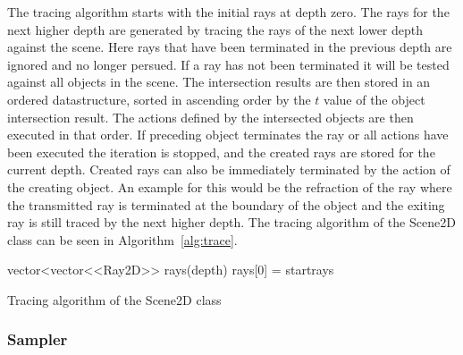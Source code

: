 \documentclass[a4paper,10pt]{article}
\newcommand{\algref}[1]{Algorithm~\ref{#1}}
\begin{document}
    The tracing algorithm starts with the initial rays at depth
    zero.
    The rays for the next higher depth are generated by tracing
    the rays of the next lower depth against the scene.
    Here rays that have been terminated in the previous depth
    are ignored and no longer persued.
    If a ray has not been terminated it will be tested against
    all objects in the scene.
    The intersection results are then stored in an ordered
    datastructure, sorted in ascending order by the $t$ value
    of the object intersection result.
    The actions defined by the intersected objects are then
    executed in that order.
    If preceding object terminates the ray or all actions
    have been executed the iteration is stopped, and the
    created rays are stored for the current depth.
    Created rays can also be immediately terminated by the action of 
    the creating object.
    An example for this would be the refraction of the ray where the
    transmitted ray is terminated at the boundary of the object and
    the exiting ray is still traced by the next higher depth. 
    The tracing algorithm of the Scene2D class can be seen in
    \algref{alg:trace}.

    \begin{algorithm}
        \SetAlgoLined
        vector<vector<<Ray2D>> rays(depth)\;
        rays[0] = startrays\;

        \caption{Tracing algorithm of the Scene2D class}
        \label{alg:trace}
    \end{algorithm}

    \subsubsection{Sampler}
\end{document}
